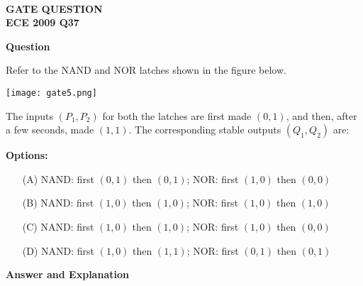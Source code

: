 \documentclass[12pt]{article}
\begin{document}
\pagestyle{empty} %

\thispagestyle{fancy} %
\fancyhf{} %
\renewcommand{\headrulewidth}{0pt} %

\vspace{10cm}
\begin{center}
   
    {\LARGE \textbf{\textcolor{darkskyblue}{\\  GATE QUESTION \\ ECE 2009 Q37}}}
\end{center}
\vspace{-1cm} %
\vspace{1em}
\noindent
{\color{violet}\textbf{Question}}

\vspace{0.5em}
\noindent
Refer to the NAND and NOR latches shown in the figure below.

\begin{center}
    \texttt{[image: gate5.png]} %
\end{center}

\vspace{0.5em}
\noindent
The inputs \((P_1, P_2)\) for both the latches are first made \((0,1)\), and then, after a few seconds, made \((1,1)\). The corresponding stable outputs \((Q_1, Q_2)\) are:

\vspace{0.5em}
\noindent
\textbf{Options:}
\begin{itemize}
    \item[(A)] NAND: first \((0,1)\) then \((0,1)\); \quad NOR: first \((1,0)\) then \((0,0)\)
    \item[(B)] NAND: first \((1,0)\) then \((1,0)\); \quad NOR: first \((1,0)\) then \((1,0)\)
    \item[(C)] NAND: first \((1,0)\) then \((1,0)\); \quad NOR: first \((1,0)\) then \((0,0)\)
    \item[(D)] NAND: first \((1,0)\) then \((1,1)\); \quad NOR: first \((0,1)\) then \((0,1)\)
\end{itemize}

\vspace{1em}
\noindent
{\color{violet}\textbf{Answer and Explanation}}
\end{document}
